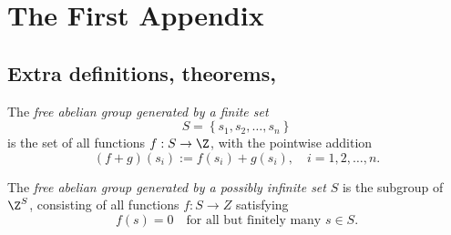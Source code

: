 \chapter{The First Appendix}

\section{Extra definitions, theorems, \etc}

\begin{defn}
	The \textit{free abelian group generated by a finite set}
	$$ S = \left\{s_1, s_2, \ldots, s_n \right\} $$
	is the set of all functions $ f : S \rightarrow \Z$, with the pointwise addition
		$$ (f + g)(s_i) := f(s_i) + g(s_i), \quad i = 1, 2, \ldots, n . $$
\end{defn}

\begin{defn} \label{ap:abeliandef}
	The \textit{free abelian group generated by a possibly infinite set} $S$ is the subgroup of $\Z^S$, consisting of all functions $f : S \rightarrow Z$ satisfying
	$$ f(s) = 0 \quad \text{for all but finitely many } s \in S. $$
\end{defn}